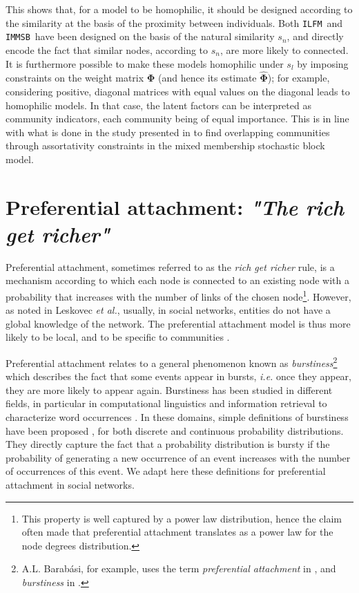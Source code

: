 \documentclass[9pt,twocolumn,twoside]{pnas-new}
\newcommand{\ifm}{\texttt{ILFM}}
\newcommand{\imb}{\texttt{IMMSB}}
\newcommand{\mat}[1]{\mathbf{#1}}
\begin{document}
This shows that, for a model to be homophilic, it should be designed according to the similarity at the basis of the proximity between individuals. Both \ifm\ and \imb\ have been designed on the basis of the natural similarity $s_n$, and directly encode the fact that similar nodes, according to $s_n$, are more likely to connected.  It is furthermore possible to make these models homophilic under $s_l$ by imposing constraints on the weight matrix $\mat{\Phi}$ (and hence its estimate $\mat{\hat{\Phi}}$); for example, considering positive, diagonal matrices with equal values on the diagonal leads to homophilic models. In that case, the latent factors can be interpreted as community indicators, each community being of equal importance. This is in line with what is done in the study presented in \cite{AMMSB} to find overlapping communities through assortativity constraints in the mixed membership stochastic block model.

\section{Preferential attachment: \emph{"The rich get richer"}}
\label{sec:burstiness}

Preferential attachment, sometimes referred to as the \textit{rich get richer} rule, is a mechanism according to which each node is connected to an existing node with a probability that increases with the number of links of the chosen node\footnote{This property is well captured by a power law distribution, hence the claim often made that preferential attachment translates as a power law for the node degrees distribution.}. However, as noted in Leskovec \textit{et al.}, usually, in social networks, entities do not have a global knowledge of the network. The preferential attachment model is thus more likely to be local, and to be specific to communities \cite{LeskovecBKT08}.

Preferential attachment relates to a general phenomenon known as \textit{burstiness}\footnote{A.L. Barab\'asi, for example, uses the term \textit{preferential attachment} in \cite{barabasi1999emergence}, and \textit{burstiness} in \cite{barabasi_burst}.} which describes the fact that some events appear in bursts, \textit{i.e.} once they appear, they are more likely to appear again. Burstiness has been studied in different fields, in particular in computational linguistics and information retrieval to characterize word occurrences \cite{church1995poisson}. In these domains, simple definitions of burstiness have been proposed \cite{clinchant2008bnb,clinchant2010information}, for both discrete and continuous probability distributions. They directly capture the fact that a probability distribution is bursty if the probability of generating a new occurrence of an event increases with the number of occurrences of this event. We adapt here these definitions for preferential attachment in social networks.
\end{document}
